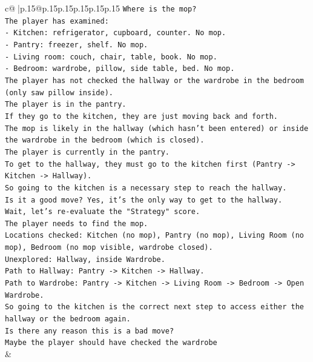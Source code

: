 \documentclass{article}
\begin{document}
{\begin{supertabular}{c@{$\;$}|p{.15\linewidth}@{}p{.15\linewidth}p{.15\linewidth}p{.15\linewidth}p{.15\linewidth}p{.15\linewidth}}
{{{\texttt{Where is the mop?} \\
\texttt{The player has examined:} \\
\texttt{{-} Kitchen: refrigerator, cupboard, counter. No mop.} \\
\texttt{{-} Pantry: freezer, shelf. No mop.} \\
\texttt{{-} Living room: couch, chair, table, book. No mop.} \\
\texttt{{-} Bedroom: wardrobe, pillow, side table, bed. No mop.} \\
\texttt{The player has not checked the hallway or the wardrobe in the bedroom (only saw pillow inside).} \\
\texttt{The player is in the pantry.} \\
\texttt{If they go to the kitchen, they are just moving back and forth.} \\
\texttt{The mop is likely in the hallway (which hasn't been entered) or inside the wardrobe in the bedroom (which is closed).} \\
\texttt{The player is currently in the pantry.} \\
\texttt{To get to the hallway, they must go to the kitchen first (Pantry {-}> Kitchen {-}> Hallway).} \\
\texttt{So going to the kitchen is a necessary step to reach the hallway.} \\
\texttt{Is it a good move? Yes, it's the only way to get to the hallway.} \\
\texttt{Wait, let's re{-}evaluate the "Strategy" score.} \\
\texttt{The player needs to find the mop.} \\
\texttt{Locations checked: Kitchen (no mop), Pantry (no mop), Living Room (no mop), Bedroom (no mop visible, wardrobe closed).} \\
\texttt{Unexplored: Hallway, inside Wardrobe.} \\
\texttt{Path to Hallway: Pantry {-}> Kitchen {-}> Hallway.} \\
\texttt{Path to Wardrobe: Pantry {-}> Kitchen {-}> Living Room {-}> Bedroom {-}> Open Wardrobe.} \\
\texttt{So going to the kitchen is the correct next step to access either the hallway or the bedroom again.} \\
\texttt{Is there any reason this is a bad move?} \\
\texttt{Maybe the player should have checked the wardrobe} \\
            }
        }
    }
    & \\ \\


\end{supertabular}}
\end{document}
